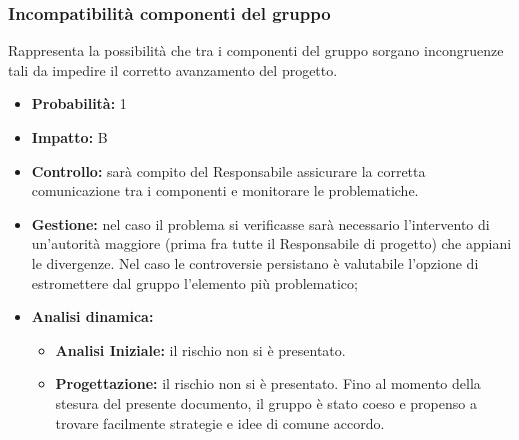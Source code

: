 \documentclass[a4paper,11pt]{article}
\begin{document}
		\subsubsection{Incompatibilità componenti del gruppo}
		Rappresenta la possibilità che tra i componenti del gruppo sorgano incongruenze tali da impedire il corretto avanzamento del progetto.
		\begin{itemize}
		\item \textbf{Probabilità:} 1
		\item \textbf{Impatto:} B
		\item \textbf{Controllo:} sarà compito del Responsabile assicurare la corretta comunicazione tra i componenti e monitorare le problematiche.
		\item \textbf{Gestione:} nel caso il problema si verificasse sarà necessario l'intervento di un'autorità maggiore (prima fra tutte il Responsabile di progetto) che appiani le divergenze. Nel caso le controversie persistano è valutabile l'opzione di estromettere dal gruppo l'elemento più problematico;
		\item \textbf{Analisi dinamica:}
			\begin{itemize}
				\item\textbf{Analisi Iniziale:} il rischio non si è presentato.
				\item\textbf{Progettazione:} il rischio non si è presentato. Fino al momento della stesura del presente documento, il gruppo è stato coeso e propenso a trovare facilmente strategie e idee di comune accordo.
			\end{itemize}
		\end{itemize}
\end{document}
